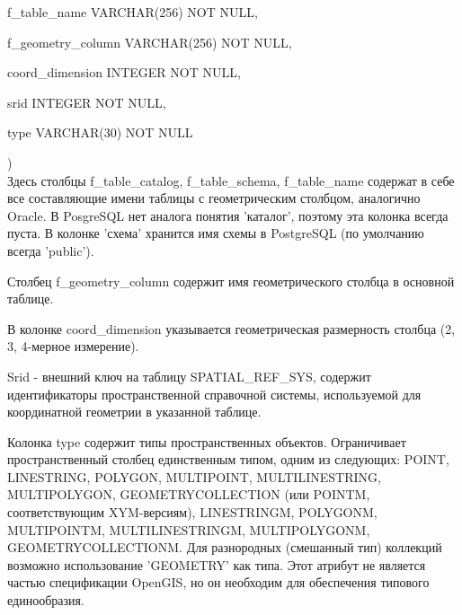 \documentclass[12pt,a4paper,oneside]{article} %
\begin{document}
	f\_table\_name       VARCHAR(256) NOT NULL,

	f\_geometry\_column  VARCHAR(256) NOT NULL,

	coord\_dimension    INTEGER NOT NULL,

	srid               INTEGER NOT NULL,

	type               VARCHAR(30) NOT NULL

)
\\[10pt]
Здесь столбцы f\_table\_catalog, f\_table\_schema, f\_table\_name содержат \linebreak
в себе все составляющие имени таблицы с геометрическим столбцом, \linebreak
аналогично Oracle. В PosgreSQL нет аналога понятия 'каталог', поэтому \linebreak
эта колонка всегда пуста. В колонке 'схема' хранится имя схемы в \linebreak
PostgreSQL (по умолчанию всегда 'public').

Столбец f\_geometry\_column содержит имя геометрического столбца в \linebreak
основной таблице.

В колонке coord\_dimension указывается геометрическая размерность \linebreak
столбца (2, 3, 4-мерное измерение).

Srid - внешний ключ на таблицу SPATIAL\_REF\_SYS, содержит \linebreak
идентификаторы пространственной справочной системы, используемой \linebreak
для координатной геометрии в указанной таблице.

Колонка type содержит типы пространственных объектов. \linebreak
Ограничивает пространственный столбец единственным типом, одним \linebreak
из следующих: POINT, LINESTRING, POLYGON, MULTIPOINT, \linebreak
MULTILINESTRING, MULTIPOLYGON, GEOMETRYCOLLECTION \linebreak
(или POINTM, соответствующим XYM-версиям), LINESTRINGM, \linebreak
POLYGONM, MULTIPOINTM, MULTILINESTRINGM, MULTIPOLYGONM, \linebreak
GEOMETRYCOLLECTIONM. Для разнородных (смешанный тип) \linebreak
коллекций возможно использование 'GEOMETRY' как типа. \linebreak
Этот атрибут не является частью спецификации OpenGIS, но он \linebreak
необходим для обеспечения типового единообразия.
\end{document}
